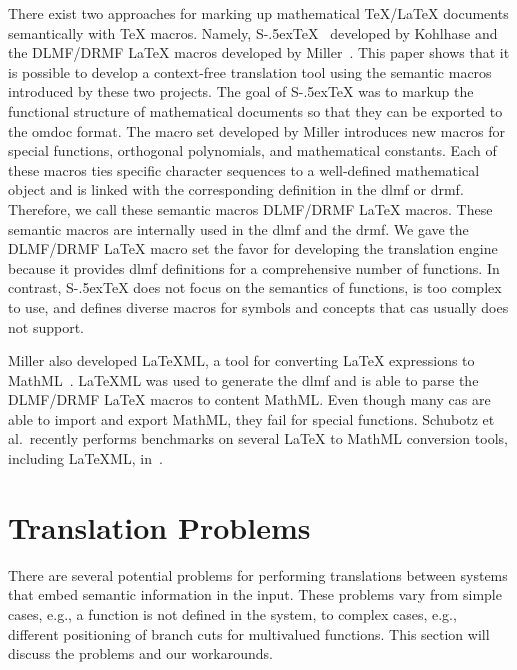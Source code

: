 \documentclass[a4paper,11pt]{article}
\newcommand{\DLMF}{DLMF}
\newcommand{\DRMF}{DRMF}
\newcommand{\Macro}{\DLMF/\DRMF{} \LaTeX{} macro}
\newcommand{\sTeX}{{\raisebox{-.5ex}S\kern-.5ex\TeX}}
\theoremstyle{defTheoStyle}
\theoremstyle{defExampStyle}
\begin{document}
There exist two approaches for marking up mathematical \TeX/\LaTeX{} documents semantically with \TeX{} macros. Namely, \sTeX{}~\parencite{sTeX} developed by Kohlhase and the \Macro s developed by Miller~\parencite{DLMF:Macros}. This paper shows that it is possible to develop a context-free translation tool using the semantic macros introduced by these two projects. The goal of \sTeX{} was to markup the functional structure of mathematical documents so that they can be exported to the \gls*{omdoc} format. The macro set developed by Miller introduces new macros for special functions, orthogonal polynomials, and mathematical constants. Each of these macros ties specific character sequences to a well-defined mathematical object and is linked with the corresponding definition in the \gls*{dlmf} or \gls*{drmf}. Therefore, we call these semantic macros \Macro s. These semantic macros are internally used in the \gls*{dlmf} and the \gls*{drmf}. We gave the \Macro{} set the favor for developing the translation engine because it provides \gls*{dlmf} definitions for a comprehensive number of functions. In contrast, \sTeX{} does not focus on the semantics of functions, is too complex to use, and defines diverse macros for symbols and concepts that \gls*{cas} usually does not support.

Miller also developed LaTeXML, a tool for converting \LaTeX{} expressions to MathML~\parencite{LaTeXML}. LaTeXML was used to generate the \gls*{dlmf} and is able to parse the \Macro s to content MathML. Even though many \gls*{cas} are able to import and export MathML, they fail for special functions. Schubotz et al.~recently performs benchmarks on several \LaTeX{} to MathML conversion tools, including LaTeXML, in~\parencite{DBLP:conf/jcdl/SchubotzGSMCG18}.

\section{Translation Problems}\label{sec:problems}
There are several potential problems for performing translations between systems that embed semantic information in the input. These problems vary from simple cases, e.g., a function is not defined in the system, to complex cases, e.g., different positioning of branch cuts for multivalued functions. This section will discuss the problems and our workarounds.
\end{document}
